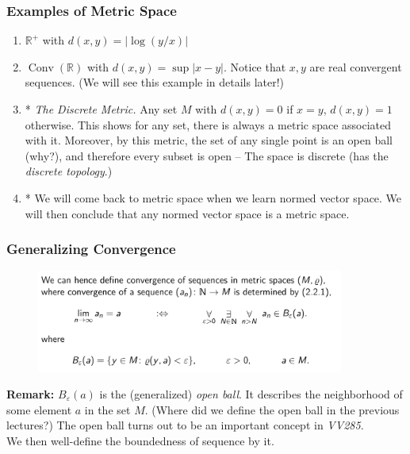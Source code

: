\documentclass[10pt, t]{beamer}
\renewcommand{\emph}[1]{{\color{themecolor}\textsl{#1}}}
\newcommand{\R}{\mathbb{R}}
\newcommand{\nullspace}{~\\[15pt]}
\begin{document}
\begin{frame}
    \frametitle{Examples of Metric Space}

    \begin{enumerate}
        \item $\R^+$ with $d(x,y)=|\log(y/x)|$
        \item $\operatorname{Conv}(\R)$ with $d(x,y)=\sup|x-y|$. Notice that $x,y$ are real convergent sequences. (We will see this example in details later!)
        \item * \emph{The Discrete Metric.} Any set $M$ with $d(x,y)=0$ if $x=y$, $d(x,y)=1$ otherwise. This shows for any set, there is always a metric space associated with it. Moreover, by this metric, the set of any single point is an open ball (why?), and therefore every subset is open -- The space is discrete (has the \emph{discrete topology}.)
        \item * We will come back to metric space when we learn normed vector space. We will then conclude that any normed vector space is a metric space.
    \end{enumerate}

\end{frame}

\begin{frame}
    \frametitle{Generalizing Convergence}

    \begin{figure}[H]
        \centering
        \includegraphics[width=0.9\textwidth]{2020-10-13-19-33-25.png}
    \end{figure}
    \textbf{Remark:} $B_\varepsilon(a)$ is the (generalized) \emph{open ball}. It describes the neighborhood of some element $a$ in the set $M$. (Where did we define the open ball in the previous lectures?) The open ball turns out to be an important concept in \textit{VV285}.
    \nullspace
    We then well-define the boundedness of sequence by it.
\end{frame}
\end{document}

